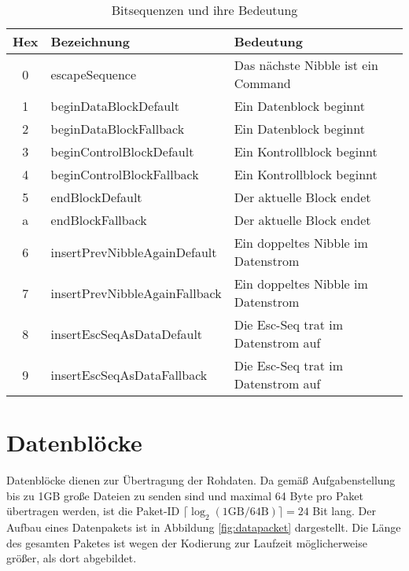 \begin{table}[H]
    \center
    \def\arraystretch{1.3}
    \begin{tabular}{|c|l|l|}
        \rowcolor{gray!50}
        \hline
        \textbf{Hex} & \textbf{Bezeichnung}          & \textbf{Bedeutung}                 \\
        \hline
        0            & escapeSequence                & Das nächste Nibble ist ein Command \\
        1            & beginDataBlockDefault         & Ein Datenblock beginnt             \\
        2            & beginDataBlockFallback        & Ein Datenblock beginnt             \\
        3            & beginControlBlockDefault      & Ein Kontrollblock beginnt          \\
        4            & beginControlBlockFallback     & Ein Kontrollblock beginnt          \\
        5            & endBlockDefault               & Der aktuelle Block endet           \\
        a            & endBlockFallback              & Der aktuelle Block endet           \\
        6            & insertPrevNibbleAgainDefault  & Ein doppeltes Nibble im Datenstrom \\
        7            & insertPrevNibbleAgainFallback & Ein doppeltes Nibble im Datenstrom \\
        8            & insertEscSeqAsDataDefault     & Die Esc-Seq trat im Datenstrom auf \\
        9            & insertEscSeqAsDataFallback    & Die Esc-Seq trat im Datenstrom auf \\
        \hline
    \end{tabular}
    \caption{Bitsequenzen und ihre Bedeutung}
    \label{tab:escape_sequences}
\end{table}

\section{Datenblöcke}
Datenblöcke dienen zur Übertragung der Rohdaten. Da gemäß Aufgabenstellung bis zu 1GB große Dateien zu senden sind und maximal 64 Byte pro Paket übertragen werden, ist die Paket-ID $\lceil \log_{2}{(1\text{GB} / 64 \text{B})} \rceil = 24$ Bit lang. Der Aufbau eines Datenpakets ist in Abbildung \ref{fig:datapacket} dargestellt. Die Länge des gesamten Paketes ist wegen der Kodierung zur Laufzeit möglicherweise größer, als dort abgebildet.
\vspace{0.5cm}

